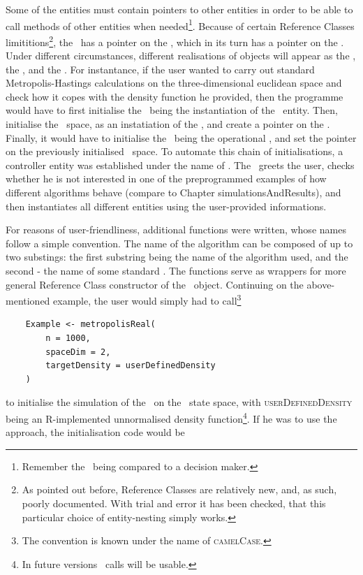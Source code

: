 Some of the entities must contain pointers to other entities in order to be able to call methods of other entities when needed\footnote{Remember the \algo\, being compared to a decision maker.}. Because of certain Reference Classes limititions\footnote{As pointed out before, Reference Classes are relatively new, and, as such, poorly documented. With trial and error it has been checked, that this particular choice of entity-nesting simply works.}, the \algo\, has a pointer on the \sspace, which in its turn has a pointer on the \measure. Under different circumstances, different realisations of objects will appear as the \algo, the \sspace, and the \measure. For instantance, if the user wanted to carry out standard Metropolis-Hastings calculations on the three-dimensional euclidean space and check how it copes with the density function he provided, then the programme would have to first  initialise the \udensity\, being the instantiation of the \measure\, entity. Then, initialise the \rspace\, space, as an instatiation of the \sspace, and create a pointer on the \udensity. Finally, it would have to initialise the \MH\, being the operational \algo, and set the pointer on the previously initialised \rspace\, space. To automate this chain of initialisations, a controller entity was established under the name of \simulation. The \simulation\, greets the user, checks whether he is not interested in one of the preprogrammed examples of how different algorithms behave (compare to Chapter simulationsAndResults), and then instantiates all different entities using the user-provided informations. 

For reasons of user-friendliness, additional functions were written, whose names follow a simple convention. The name of the algorithm can be composed of up to two substings: the first substring being the name of the algorithm used, and the second - the name of some standard \sspace. The functions serve as wrappers for more general Reference Class constructor of the \simulation\, object. Continuing on the above-mentioned example, the user would simply had to call\footnote{The convention is known under the name of \textsc{camelCase}.}

\begin{lstlisting}
	Example <- metropolisReal(
		n = 1000,
		spaceDim = 2,
		targetDensity = userDefinedDensity
	)
\end{lstlisting}  
to initialise the simulation of the \MHalgo\, on the \rspace\, state space, with \textsc{userDefinedDensity} being an R-implemented unnormalised density function\footnote{In future versions \Cpp\, calls will be usable.}. If he was to use the \PTalgo\, approach, the initialisation code would be 


